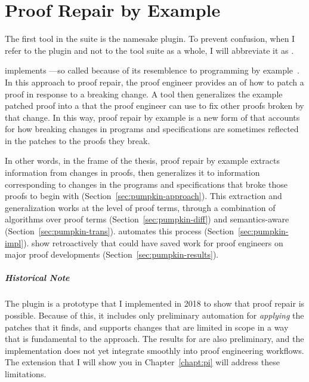 \chapter{Proof Repair by Example}
\label{ch:example}

The first tool in the    suite is the namesake \sysnamelong plugin.
To prevent confusion, when I refer to the \sysnamelong plugin and not to the tool suite as a whole, I will abbreviate it as \intro{\sysname}.

\sysname implements ---so called because of its resemblence to programming by example~\cite{DBLP:journals/ftpl/GulwaniPS17}.
In this approach to proof repair, the proof engineer provides an  of how to patch a proof in response to a breaking change.
A tool then generalizes the example patched proof into a  that the proof engineer can use to fix other proofs broken by that change.
In this way, proof repair by example is a new form of  that accounts for how 
breaking changes in programs and specifications are sometimes reflected in the patches to the proofs they break.

In other words, in the frame of the thesis, proof repair by example extracts information from changes in proofs,
then generalizes it to information corresponding to changes in the programs and specifications that broke those proofs to begin with (Section~\ref{sec:pumpkin-approach}).
This extraction and generalization works at the level of proof terms, through a combination of  algorithms 
over proof terms (Section~\ref{sec:pumpkin-diff}) and 
semantics-aware  (Section~\ref{sec:pumpkin-trans}).
 automates this process (Section~\ref{sec:pumpkin-impl}).
 show retroactively that \sysname could have saved work for proof engineers
on major proof developments (Section~\ref{sec:pumpkin-results}).

\paragraph{Historical Note}
The \sysname plugin is a prototype that I implemented in 2018 to show that proof repair is possible.
Because of this, it includes only preliminary automation for \textit{applying} the patches that it finds,
and supports changes that are limited in scope in a way that is fundamental to the approach.
The results for \sysname are also preliminary, and the implementation does not yet integrate smoothly into proof engineering workflows.
The \toolnamec extension that I will show you in Chapter~\ref{chapt:pi} will address these limitations.















